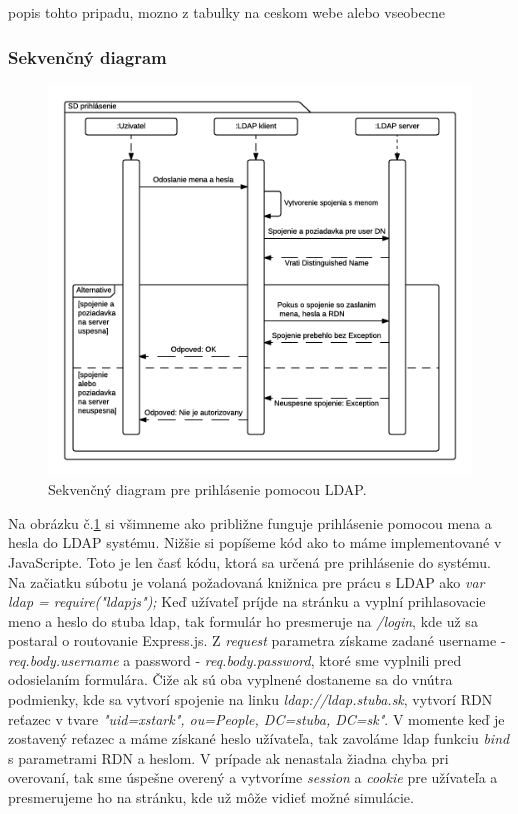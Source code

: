 popis tohto pripadu, mozno z tabulky na ceskom webe alebo vseobecne


\subsubsection{Sekvenčný diagram}\label{diagram-sequence-section}

\begin{figure}[H]
  \centering
  \includegraphics[scale=0.7]{img/diagrams/sequence-ldap.png}
  \caption{Sekvenčný diagram pre prihlásenie pomocou LDAP.}
  \label{img-sequence-ldap-login}
\end{figure}

Na obrázku č.\ref{img-sequence-ldap-login} si všimneme ako približne funguje prihlásenie pomocou mena a hesla do LDAP systému. Nižšie si popíšeme kód ako to máme implementované v JavaScripte. Toto je len časť kódu, ktorá sa určená pre prihlásenie do systému. Na začiatku súbotu je volaná požadovaná knižnica pre prácu s LDAP ako \textit{var ldap = require("ldapjs");}
Keď užívateľ príjde na stránku a vyplní prihlasovacie meno a heslo do stuba ldap, tak formulár ho presmeruje na \textit{/login}, kde už sa postaral o routovanie Express.js. Z \textit{request} parametra získame zadané username - \textit{req.body.username} a password - \textit{req.body.password}, ktoré sme vyplnili pred odosielaním formulára. Čiže ak sú oba vyplnené dostaneme sa do vnútra podmienky, kde sa vytvorí spojenie na linku \textit{ldap://ldap.stuba.sk}, vytvorí RDN reťazec v tvare \textit{"uid=xstark", ou=People, DC=stuba, DC=sk"}.
V momente keď je zostavený reťazec a máme získané heslo užívateľa, tak zavoláme ldap funkciu \textit{bind} s parametrami RDN a heslom. V prípade ak nenastala žiadna chyba pri overovaní, tak sme úspešne overený a vytvoríme \textit{session} a \textit{cookie} pre užívateľa a presmerujeme ho na stránku, kde už môže vidieť možné simulácie.

